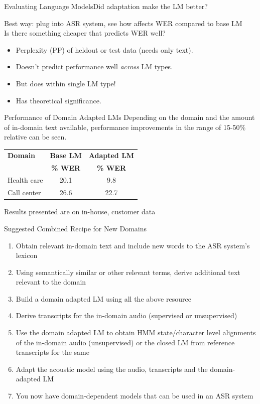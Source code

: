 \begin{frame}{Evaluating Language Models}{Did adaptation make the LM better?}

Best way: plug into ASR system, see how affects WER compared to base LM \\

Is there something cheaper that predicts WER well?
\begin{itemize}
\item {\color{red} {Perplexity} (PP) } of heldout or test data (needs only text).
\item Doesn't predict performance well \emph{across} LM types.
\item But does within single LM type!
\item Has theoretical significance.
\end{itemize}


\end{frame}


\begin{frame}{Performance of Domain Adapted LMs}{}
  Depending on the domain and the amount of in-domain text available, performance improvements in the range of 15-50\% relative can be seen.
  \vfill
  \centering
  \begin{tabular}{@{}lc@{}c@{}} \toprule
    {\bf Domain } &  {\bf Base LM } & {\bf Adapted LM } \\ 
    {\bf   } &  {\bf   \% WER} & {\bf \% WER } \\ \midrule
    Health care & 20.1 & 9.8 \\
    Call center&  26.6 & 22.7 \\ \bottomrule
  \end{tabular}
  \vfill
  \raggedright
  Results  presented are on in-house, customer data
\end{frame}


\begin{frame} {Suggested Combined Recipe for New Domains}
\begin{enumerate}
\item Obtain relevant in-domain text and include new words to the ASR system's lexicon
\item Using semantically similar or other relevant terms, derive additional text relevant to the domain
\item Build a domain adapted LM using all the above resource
\item Derive transcripts for the in-domain audio (supervised or unsupervised)
\item Use the domain adapted LM to obtain HMM state/character level alignments  of the in-domain audio (unsupervised) or the closed LM from reference transcripts for the same
\item Adapt the acoustic model using the audio, transcripts and the domain-adapted LM
\item You now have domain-dependent models that can be used in an ASR system
\end{enumerate}
\end{frame}

